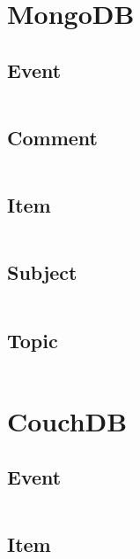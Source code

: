 \section{MongoDB}
\label{sec:source-mongodb}

\subsection*{Event}
\inputminted[baselinestretch=1,fontsize=\footnotesize]{ruby}{app/app/models/mongo_db/event.rb}

\subsection*{Comment}
\inputminted[baselinestretch=1,fontsize=\footnotesize]{ruby}{app/app/models/mongo_db/comment.rb}

\subsection*{Item}
\inputminted[baselinestretch=1,fontsize=\footnotesize]{ruby}{app/app/models/mongo_db/item.rb}

\subsection*{Subject}
\inputminted[baselinestretch=1,fontsize=\footnotesize]{ruby}{app/app/models/mongo_db/subject.rb}

\subsection*{Topic}
\inputminted[baselinestretch=1,fontsize=\footnotesize]{ruby}{app/app/models/mongo_db/topic.rb}

\clearpage{}
\section{CouchDB}
\label{sec:source-couchdb}

\subsection*{Event}
\inputminted[baselinestretch=1,fontsize=\footnotesize]{ruby}{app/app/models/couch_db/event.rb}

\subsection*{Item}
\inputminted[baselinestretch=1,fontsize=\footnotesize]{ruby}{app/app/models/couch_db/item.rb}

